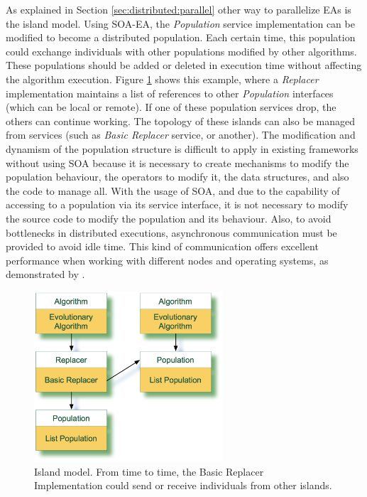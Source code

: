 As explained in Section \ref{sec:distributed:parallel} other way to parallelize EAs is the island model. Using SOA-EA, the {\em Population} service implementation can be modified to become a distributed population. Each certain time, this population could exchange individuals with other populations modified by other algorithms. These populations should be added or deleted in execution time without affecting the algorithm execution. Figure \ref{POPULATION} shows this example, where a {\em Replacer} implementation maintains a list of references to other {\em Population} interfaces (which can be local or remote).  If one of these population services drop, the others can continue working. The topology of these islands can also be managed from services (such as {\em Basic Replacer} service, or another). The  modification and dynamism of the population structure is difficult to apply in existing frameworks without using SOA because it is necessary to create mechanisms to modify the population behaviour, the operators to modify it, the data structures, and also the code to manage all. With the usage of SOA, and due to the capability of accessing to a population via its service interface, it is not necessary to modify the source code to modify the population and its behaviour. Also, to avoid bottlenecks in distributed executions, asynchronous communication must be provided to avoid idle time. This kind of communication offers excellent performance when working with different nodes and operating systems, as demonstrated by \cite{Alba2002Heterogeneous}.



\begin{figure}
\centering
\includegraphics[width=7cm]{gfx/soaea/island.jpg}
\caption{Island model. From time to time, the Basic Replacer Implementation could send or receive individuals from other islands.}
\label{POPULATION}
\end{figure}



